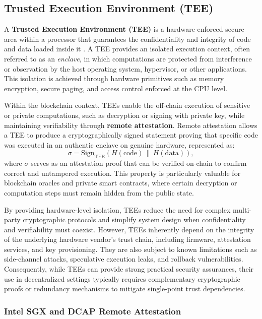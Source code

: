 \documentclass[12pt,a4paper]{article}
\begin{document}
\subsection{Trusted Execution Environment (TEE)}

A \textbf{Trusted Execution Environment (TEE)} is a hardware-enforced secure area within a processor that guarantees the confidentiality and integrity of code and data loaded inside it \parencite{sabt2015trusted}.  
A TEE provides an isolated execution context, often referred to as an \textit{enclave}, in which computations are protected from interference or observation by the host operating system, hypervisor, or other applications.   This isolation is achieved through hardware primitives such as memory encryption, secure paging, and access control enforced at the CPU level.  

Within the blockchain context, TEEs enable the off-chain execution of sensitive or private computations, such as decryption or signing with private key, while maintaining verifiability through \textbf{remote attestation}.  
Remote attestation allows a TEE to produce a cryptographically signed statement proving that specific code was executed in an authentic enclave on genuine hardware, represented as:
$$
\sigma = \text{Sign}_{\text{TEE}}(H(\text{code}) \, \| \, H(\text{data})),
$$
where $\sigma$ serves as an attestation proof that can be verified on-chain to confirm correct and untampered execution. This property is particularly valuable for blockchain oracles and private smart contracts, where certain decryption or computation steps must remain hidden from the public state.

By providing hardware-level isolation, TEEs reduce the need for complex multi-party cryptographic protocols and simplify system design when confidentiality and verifiability must coexist.
However, TEEs inherently depend on the integrity of the underlying hardware vendor’s trust chain, including firmware, attestation services, and key provisioning.
They are also subject to known limitations such as side-channel attacks, speculative execution leaks, and rollback vulnerabilities.
Consequently, while TEEs can provide strong practical security assurances, their use in decentralized settings typically requires complementary cryptographic proofs or redundancy mechanisms to mitigate single-point trust dependencies.

\subsubsection{Intel SGX and DCAP Remote Attestation}
\end{document}

